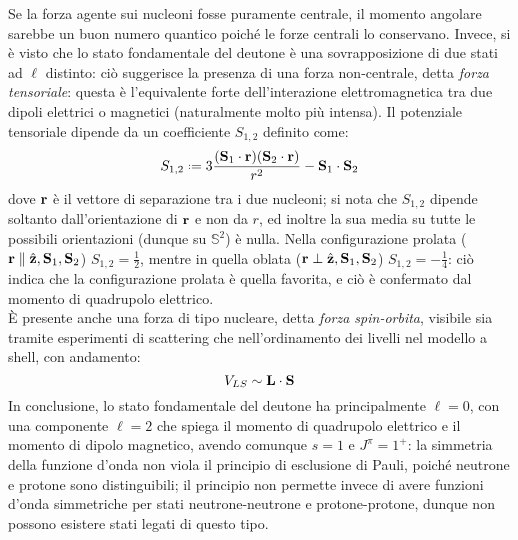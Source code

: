 Se la forza agente sui nucleoni fosse puramente centrale, il momento angolare sarebbe un buon numero quantico poiché le forze centrali lo conservano. Invece, si è visto che lo stato fondamentale del deutone è una sovrapposizione di due stati ad $ \ell $ distinto: ciò suggerisce la presenza di una forza non-centrale, detta \textit{forza tensoriale}: questa è l'equivalente forte dell'interazione elettromagnetica tra due dipoli elettrici o magnetici (naturalmente molto più intensa). Il potenziale tensoriale dipende da un coefficiente $ S_{1,2} $ definito come:
\begin{equation}
	S_{1,2} \defeq 3 \frac{(\ve{S}_1 \cdot \ve{r}) (\ve{S}_2 \cdot \ve{r})}{r^2} - \ve{S}_1 \cdot \ve{S}_2
	\label{eq:4.19}
\end{equation}
dove $ \mathbf{r} $ è il vettore di separazione tra i due nucleoni; si nota che $ S_{1,2} $ dipende soltanto dall'orientazione di $ \mathbf{r} $ e non da $ r $, ed inoltre la sua media su tutte le possibili orientazioni (dunque su $ \mathbb{S}^2 $) è nulla. Nella configurazione prolata ($ \mathbf{r} \parallel \hat{\mathbf{z}},\mathbf{S}_1,\mathbf{S}_2 $) $ S_{1,2} = \frac{1}{2} $, mentre in quella oblata ($ \mathbf{r} \perp \hat{\mathbf{z}},\mathbf{S}_1,\mathbf{S}_2 $) $ S_{1,2} = - \frac{1}{4} $: ciò indica che la configurazione prolata è quella favorita, e ciò è confermato dal momento di quadrupolo elettrico.\\
È presente anche una forza di tipo nucleare, detta \textit{forza spin-orbita}, visibile sia tramite esperimenti di scattering che nell'ordinamento dei livelli nel modello a shell, con andamento:
\begin{equation}
	V_{LS} \sim \mathbf{L} \cdot \mathbf{S}
	\label{eq:4.20}
\end{equation}
In conclusione, lo stato fondamentale del deutone ha principalmente $ \ell = 0 $, con una componente $ \ell = 2 $ che spiega il momento di quadrupolo elettrico e il momento di dipolo magnetico, avendo comunque $ s = 1 $ e $ J^{\pi} = 1^+ $: la simmetria della funzione d'onda non viola il principio di esclusione di Pauli, poiché neutrone e protone sono distinguibili; il principio non permette invece di avere funzioni d'onda simmetriche per stati neutrone-neutrone e protone-protone, dunque non possono esistere stati legati di questo tipo.










